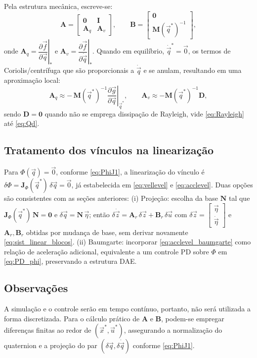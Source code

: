 Pela estrutura mecânica, escreve-se:
\begin{equation}
\mathbf A=
\begin{bmatrix}
\mathbf 0 & \mathbf I\\
\mathbf A_q & \mathbf A_v
\end{bmatrix},
\qquad
\mathbf B=
\begin{bmatrix}
\mathbf 0\\
\mathbf M(\vec q^{*})^{-1}
\end{bmatrix},
\label{eq:blocos_A_B}
\end{equation}
onde
$\mathbf A_q=\left.\dfrac{\partial \vec f}{\partial \vec q}\right|_{*}$ e
$\mathbf A_v=\left.\dfrac{\partial \vec f}{\partial \dot{\vec q}}\right|_{*}$.
Quando em equilíbrio, $\dot{\vec q}^{*}=\vec 0$, os termos de Coriolis/centrífuga que são proporcionais a
$\dot{\vec q}$ e se anulam, resultando em uma aproximação local:
\begin{equation}
\mathbf A_q \approx
-\,\mathbf M(\vec q^{*})^{-1}
\left.\frac{\partial \vec g}{\partial \vec q}\right|_{\vec q^{*}},
\qquad
\mathbf A_v \approx
-\mathbf M(\vec q^{*})^{-1}\mathbf D,
\label{eq:aprox_Aq_Av}
\end{equation}
sendo $\mathbf D=\mathbf 0$
quando não se emprega dissipação de Rayleigh, vide \eqref{eq:Rayleigh} até \eqref{eq:Qd}.

\subsection{Tratamento dos vínculos na linearização}
Para $\Phi(\vec q)=\vec 0$, conforme \eqref{eq:PhiJ1},
a linearização do vínculo é
$\delta\Phi=\mathbf J_{\!\Phi}(\vec q^{*})\,\delta\vec q=\vec 0$,
já estabelecida em \eqref{eq:vellevel} e
\eqref{eq:acclevel}.
Duas opções são consistentes com as seções anteriores:
(i) Projeção: escolha da base $\mathbf N$ tal que
$\mathbf J_{\!\Phi}(\vec q^{*})\,\mathbf N=\mathbf 0$ e
$\delta\vec q=\mathbf N\,\vec\eta$;
então $\delta\dot{\vec z}=\mathbf A_r\,\delta\vec z+\mathbf B_r\,\delta\vec u$
com $\delta\vec z=\begin{bmatrix}\vec\eta\\ \dot{\vec\eta}\end{bmatrix}$
e $\mathbf A_r,\mathbf B_r$
obtidas por mudança de base, sem derivar novamente
\eqref{eq:sist_linear_blocos}.  
(ii) Baumgarte: incorporar
\eqref{eq:acclevel_baumgarte} como relação de aceleração adicional, equivalente a um controle PD sobre $\Phi$ em \eqref{eq:PD_phi}, preservando a estrutura DAE.

\subsection{Observações}
A simulação e o controle serão em tempo contínuo, portanto, não será utilizada a forma discretizada.
Para o cálculo prático de
$\mathbf A$ e $\mathbf B$,
podem-se empregar diferenças finitas ao redor de
$(\vec x^{*},\vec u^{*})$,
assegurando a normalização do quaternion e a projeção do par
$(\delta\vec q,\delta\dot{\vec q})$
conforme \eqref{eq:PhiJ1}.
